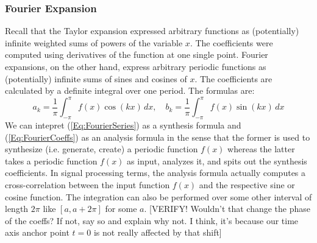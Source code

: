 

\subsubsection{Fourier Expansion}
Recall that the Taylor expansion expressed arbitrary functions as (potentially) infinite weighted sums of powers of the variable $x$. The coefficients were computed using derivatives of the function at one single point. Fourier expansions, on the other hand, express arbitrary periodic functions as (potentially) infinite sums of sines and cosines of $x$. The coefficients are calculated by a definite integral over one period. The formulas are:
\begin{equation}
\label{Eq:FourierCoeffs}	
 a_k = \frac{1}{\pi} \int_{-\pi}^{\pi} f(x) \cos(k x) \, dx, \quad
 b_k = \frac{1}{\pi} \int_{-\pi}^{\pi} f(x) \sin(k x) \, dx 
\end{equation}
We can intepret (\ref{Eq:FourierSeries}) as a synthesis formula and (\ref{Eq:FourierCoeffs}) as an analysis formula in the sense that the former is used to synthesize (i.e. generate, create) a periodic function $f(x)$ whereas the latter takes a periodic function $f(x)$ as input, analyzes it, and spits out the synthesis coefficients. In signal processing terms,  the analysis formula actually computes a cross-correlation between the input function $f(x)$ and the respective sine or cosine function. The integration can also be performed over some other interval of length $2\pi$ like $[a,a+2\pi]$ for some $a$. [VERIFY! Wouldn't that change the phase of the coeffs? If not, say so and explain why not. I think, it's because our time axis anchor point $t=0$ is not really affected by that shift] 


